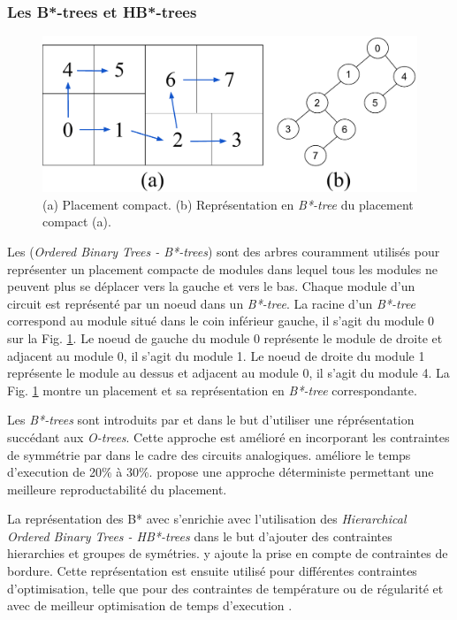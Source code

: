 \subsubsection{Les B*-trees et HB*-trees}
\begin{figure}[h]
\begin{center}
  \includegraphics[height=0.19\textheight]{Figures/4a.pdf}
  \caption{(a) Placement compact. (b) Représentation en {\it B*-tree} du placement compact (a).}
\label{fig:4a}
\end{center}
\end{figure}
 Les ({\it Ordered Binary Trees - B*-trees}) sont des arbres couramment utilisés pour représenter un placement compacte de modules dans lequel tous les modules ne peuvent plus se déplacer vers la gauche et vers le bas. Chaque module d'un circuit est représenté par un noeud dans un {\it B*-tree}. La racine d'un {\it B*-tree} correspond au module situé dans le coin inférieur gauche, il s'agit du module 0 sur la Fig. \ref{fig:4a}. Le noeud de gauche du module 0 représente le module de droite et adjacent au module 0, il s'agit du module 1. Le noeud de droite du module 1 représente le module au dessus et adjacent au module 0, il s'agit du module 4. La Fig. \ref{fig:4a} montre un placement et sa représentation en {\it B*-tree} correspondante. \newline

Les {\it B*-trees} sont introduits par \cite{Balasa2000.2} et \cite{Chang2000} dans le but d'utiliser une réprésentation succédant aux {\it O-trees}. Cette approche est amélioré en incorporant les contraintes de symmétrie par \cite{Balasa2002} dans le cadre des circuits analogiques. \cite{Maruvada2005} améliore le temps d'execution de 20\% à 30\%. \cite{Strasser08} propose une approche déterministe permettant une meilleure reproductabilité du placement. \newline

La représentation des B* avec s'enrichie avec l'utilisation des {\it Hierarchical Ordered Binary Trees - HB*-trees} \cite{Lin09} dans le but d'ajouter des contraintes hierarchies et groupes de symétries. \cite{Lin2010} y ajoute la prise en compte de contraintes de bordure. Cette représentation est ensuite utilisé pour différentes contraintes d'optimisation, telle que pour des contraintes de température \cite{Lin11} ou de régularité \cite{Chou2011} et avec de meilleur optimisation de temps d'execution \cite{Tsao2011}.


